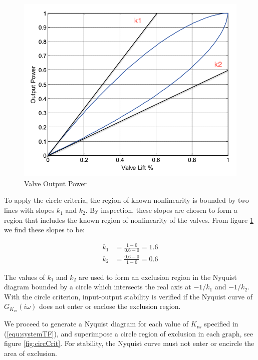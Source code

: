 \documentclass[a4paper, titlepage]{article}
\begin{document}
\begin{figure}[h!]
\center
\includegraphics[scale=0.25]{../figures/valveOutputPower.png}
\caption{Valve Output Power}
\label{fig:valvepower}
\end{figure}

To apply the circle criteria, the region of known nonlinearity is bounded by two lines with slopes $k_{1}$ and $k_{2}$.  By inspection, these slopes are chosen to form a region that includes the known region of nonlinearity of the valves.  From figure \ref{fig:valvepower} we find these slopes to be:

\begin{equation}
\begin{split}
k_{1} &= \frac{1-0}{0.6-0} = 1.6 \\
k_{2} &= \frac{0.6-0}{1-0} = 0.6
\end{split}
\label{equ:k_values}
\end{equation}

The values of $k_{1}$ and $k_{2}$ are used to form an exclusion region in the Nyquist diagram bounded by a circle which intersects the real axis at $-1/k_{1}$ and $-1/k_{2}$.
With the circle criterion, input-output stability is verified if the Nyquist curve of $G_{K_{vs}}(i\omega)$ does not enter or enclose the exclusion region.

We proceed to generate a Nyquist diagram for each value of $K_{vs}$ specified in (\ref{equ:systemTF}), and superimpose a circle region of exclusion in each graph, see figure \ref{fig:circCrit}.
For stability, the Nyquist curve must not enter or encircle the area of exclusion.
\end{document}
